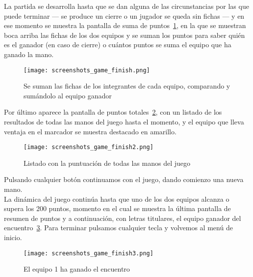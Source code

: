 La partida se desarrolla hasta que se dan alguna de las circunstancias por las que puede terminar --- se produce un cierre o 
un jugador se queda sin fichas --- y en ese momento se muestra la pantalla de suma de puntos~\ref{fig:screenshotsgamefinish},
en la que se muestran boca arriba las fichas de los dos equipos y se suman los puntos para saber quién es el ganador (en caso
de cierre) o cuántos puntos se suma el equipo que ha ganado la mano.

\begin{figure}[h]
  \begin{center}
    \texttt{[image: screenshots\_game\_finish.png]}
  \end{center}
  \caption{Se suman las fichas de los integrantes de cada equipo, comparando y sumándolo al equipo ganador}
  \label{fig:screenshotsgamefinish}
\end{figure}

Por último aparece la pantalla de puntos totales~\ref{fig:screenshotsgamefinish2}, con un listado de los resultados de
todas las manos del juego hasta el momento, y el equipo que lleva ventaja en el marcador se muestra destacado en amarillo. \\

\begin{figure}[h]
  \begin{center}
    \texttt{[image: screenshots\_game\_finish2.png]}
  \end{center}
  \caption{Listado con la puntuación de todas las manos del juego}
  \label{fig:screenshotsgamefinish2}
\end{figure}

Pulsando cualquier botón continuamos con el juego, dando comienzo una nueva mano. \\

La dinámica del juego continúa hasta que uno de los dos equipos alcanza o supera los 200 puntos, momento en el cual se
muestra la última pantalla de resumen de puntos y a continuación, con letras titulares, el equipo ganador del
encuentro~\ref{fig:screenshotsgamefinish3}. Para terminar pulsamos cualquier tecla y volvemos al menú de inicio.

\begin{figure}[h]
  \begin{center}
    \texttt{[image: screenshots\_game\_finish3.png]}
  \end{center}
  \caption{El equipo 1 ha ganado el encuentro}
  \label{fig:screenshotsgamefinish3}
\end{figure}


